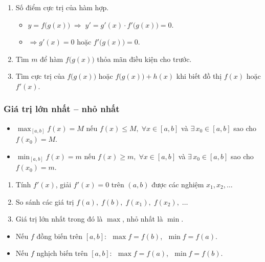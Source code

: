 \documentclass[12pt,a4paper]{article}
\begin{document}
\begin{enumerate}[label=\textbf{Dạng \arabic*:}, leftmargin=*, align=left]
\begin{itemize}
    \end{itemize}
  \item Số điểm cực trị của hàm hợp.
    \begin{itemize}
      \item $y = f\bigl(g(x)\bigr) \;\Rightarrow\; y' = g'(x) \cdot f'\bigl(g(x)\bigr) = 0$.
      \item $\Rightarrow g'(x) = 0$ hoặc $f'\bigl(g(x)\bigr) = 0$.
    \end{itemize}
  \item Tìm $m$ để hàm $f\bigl(g(x)\bigr)$ thỏa mãn điều kiện cho trước.
  \item Tìm cực trị của $f\bigl(g(x)\bigr)$ hoặc $f\bigl(g(x)\bigr) + h(x)$ khi biết đồ thị $f(x)$ hoặc $f'(x)$.
\end{enumerate}

\subsubsection{Giá trị lớn nhất -- nhỏ nhất}

\begin{dinhnghia}
  \begin{itemize}
    \item $\displaystyle\max_{[a,b]} f(x) = M$ nếu $f(x) \le M,\;\forall x \in [a,b]$ và $\exists\, x_0 \in [a,b]$ sao cho $f(x_0) = M$.
    \item $\displaystyle\min_{[a,b]} f(x) = m$ nếu $f(x) \ge m,\;\forall x \in [a,b]$ và $\exists\, x_0 \in [a,b]$ sao cho $f(x_0) = m$.
  \end{itemize}
\end{dinhnghia}

\begin{phuongphap}[title={Tìm GTLN--GTNN trên đoạn $[a,b]$}]
  \begin{enumerate}
    \item Tính $f'(x)$, giải $f'(x) = 0$ trên $(a,b)$ được các nghiệm $x_1, x_2, \ldots$
    \item So sánh các giá trị $f(a),\; f(b),\; f(x_1),\; f(x_2),\; \ldots$
    \item Giá trị lớn nhất trong đó là $\max$, nhỏ nhất là $\min$.
  \end{enumerate}
\end{phuongphap}

\begin{tinhchat}
  \begin{itemize}
    \item Nếu $f$ đồng biến trên $[a,b]$:
      $\;\max f = f(b)$, $\;\min f = f(a)$.
    \item Nếu $f$ nghịch biến trên $[a,b]$:
      $\;\max f = f(a)$, $\;\min f = f(b)$.
  \end{itemize}
\end{tinhchat}
\end{document}
